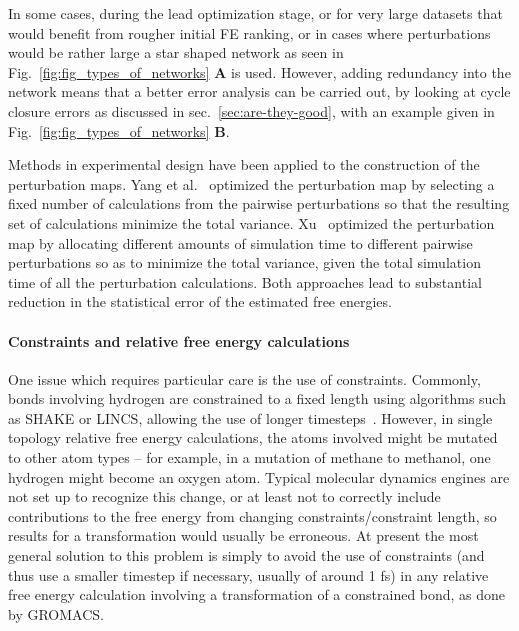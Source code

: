 \documentclass[9pt,bestpractices]{livecoms}
\begin{document}
In some cases, during the lead optimization stage, or for very large datasets that would benefit from rougher initial FE ranking, or in cases where perturbations would be rather large a star shaped network as seen in Fig.~\ref{fig:fig_types_of_networks} \textbf{A} is used. However, adding redundancy into the network means that a better error analysis can be carried out, by looking at cycle closure errors as discussed in sec.~\ref{sec:are-they-good}, with an example given in Fig.~\ref{fig:fig_types_of_networks} \textbf{B}.

%
Methods in experimental design have been applied to the construction of the perturbation maps. Yang et al.~\cite{yang2020optimal} optimized the perturbation map by selecting a fixed number of calculations from the pairwise perturbations so that the resulting set of calculations minimize the total variance. Xu~\cite{xu2019optimal} optimized the perturbation map by allocating different amounts of simulation time to different pairwise perturbations so as to minimize the total variance, given the total simulation time of all the perturbation calculations. Both approaches lead to substantial reduction in the statistical error of the estimated free energies.  

%
\paragraph{Constraints and relative free energy calculations}
One issue which requires particular care is the use of constraints.
Commonly, bonds involving hydrogen are constrained to a fixed length using algorithms such as SHAKE or LINCS, allowing the use of longer timesteps~\cite{krautler2001fast}.
However, in single topology relative free energy calculations, the atoms involved might be mutated to other atom types -- for example, in a mutation of methane to methanol, one hydrogen might become an oxygen atom.
Typical molecular dynamics engines are not set up to recognize this change, or at least not to correctly include contributions to the free energy from changing constraints/constraint length, so results for a transformation would usually be erroneous.
At present the most general solution to this problem is simply to avoid the use of constraints (and thus use a smaller timestep if necessary, usually of around 1 fs) in any relative free energy calculation involving a transformation of a constrained bond, as done by GROMACS. 

%
\end{document}
